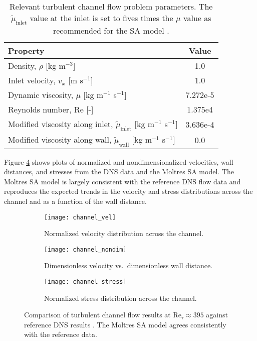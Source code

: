 \begin{table}[htb]
  \centering
  \small
  \caption{Relevant turbulent channel flow problem parameters. The $\tilde{\mu}_\text{inlet}$ value
  at the inlet is set to fives times the $\mu$ value as recommended for the \gls{SA} model
  \cite{spalart_one-equation_1994}.}
  \begin{tabular}{l S}
    \toprule
    Property & {Value} \\
    \midrule
    Density, $\rho$ [kg m$^{-3}$] & 1.0 \\
    Inlet velocity, $v_x$ [m s$^{-1}$] & 1.0 \\
    Dynamic viscosity, $\mu$ [kg m$^{-1}$ s$^{-1}$] & 7.272e-5 \\
    Reynolds number, Re [-] & 1.375e4 \\
    Modified viscosity along inlet, $\tilde{\mu}_\text{inlet}$ [kg m$^{-1}$ s$^{-1}$] & 3.636e-4 \\
    Modified viscosity along wall, $\tilde{\mu}_\text{wall}$ [kg m$^{-1}$ s$^{-1}$] & 0.0 \\
    \bottomrule
  \end{tabular}
  \label{table:channel}
\end{table}

Figure \ref{fig:channel-verification} shows plots of normalized and nondimensionalized velocities,
wall distances, and stresses from the \gls{DNS} data \cite{moser_direct_1999}
and the Moltres \gls{SA} model. The Moltres \gls{SA} model is largely consistent with the reference
\gls{DNS} flow data and reproduces the expected trends in the velocity and stress distributions
across the channel and as a function of the wall distance.

\begin{figure}[htb!]
  \centering
  \begin{subfigure}[b]{0.48\columnwidth}
    \centering
    \texttt{[image: channel\_vel]}
    \caption{Normalized velocity distribution across the channel.}
    \label{fig:channel-vel}
  \end{subfigure}
  \hfill
  \begin{subfigure}[b]{0.48\columnwidth}
    \centering
    \texttt{[image: channel\_nondim]}
    \caption{Dimensionless velocity vs.\ dimensionless wall distance.}
    \label{fig:channel-nondim}
  \end{subfigure}
  \begin{subfigure}[b]{0.48\columnwidth}
    \centering
    \texttt{[image: channel\_stress]}
    \caption{Normalized stress distribution across the channel.}
    \label{fig:channel-stress}
  \end{subfigure}
  \caption{Comparison of turbulent channel flow results at Re$_\tau\approx395$ against reference
  \gls{DNS} results \cite{moser_direct_1999}. The Moltres \gls{SA} model agrees consistently with
  the reference data.}
  \label{fig:channel-verification}
\end{figure}

